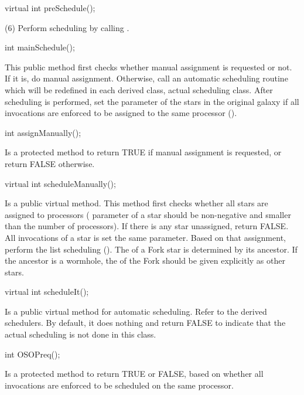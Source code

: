 \begin{example}
virtual int preSchedule();
\end{example}

(6) Perform scheduling by calling .

\begin{example} 
int mainSchedule();
\end{example}

This public method first checks whether manual assignment is requested or not.
If it is, do manual assignment. Otherwise, call an automatic scheduling 
routine which will be redefined in each derived class, actual scheduling
class. After scheduling is performed, set the  parameter of
the stars in the original galaxy if all invocations are enforced to be
assigned to the same processor ().

\begin{example}
int assignManually();
\end{example}

Is a protected method to return TRUE if manual assignment is requested, or
return FALSE otherwise.

\begin{example}
virtual int scheduleManually();
\end{example}

Is a public virtual method. This method first checks whether all stars
are assigned to processors ( parameter of a star should be
non-negative and smaller than the number of processors). If there is any
star unassigned, return FALSE. All invocations of a star is set the same
 parameter. Based on that assignment, perform the
list scheduling (). The  of a Fork
star is determined by its ancestor. If the ancestor is a wormhole, the
 of the Fork should be given explicitly as other stars.

\begin{example}
virtual int scheduleIt();
\end{example}

Is a public virtual method for automatic scheduling. Refer to the derived
schedulers. By default, it does nothing and return FALSE to indicate that
the actual scheduling is not done in this class.

\begin{example}
int OSOPreq();
\end{example}

Is a protected method to return TRUE or FALSE, based on whether all
invocations are enforced to be scheduled on the same processor.

